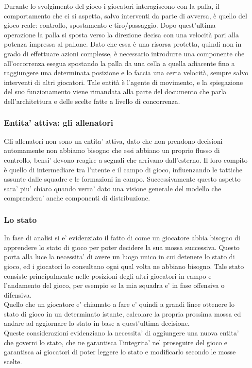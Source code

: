 Durante lo svolgimento del gioco i giocatori interagiscono con la palla, il comportamento che ci si aspetta, salvo interventi da parte di avversa, è quello del gioco reale: controllo, spostamento e tiro/passaggio. Dopo quest'ultima operazione la palla si sposta verso la direzione decisa con una velocità pari alla potenza impressa al pallone. Dato che essa è una risorsa protetta, quindi non in grado di effettuare azioni complesse, è necessario introdurre una componente che all'occorrenza esegua spostando la palla da una cella a quella adiacente fino a raggiungere una determinata posizione e lo faccia una certa velocità, sempre salvo interventi di altri giocatori. Tale entità è l'agente di movimento, e la spiegazione del suo funzionamento viene rimandata alla parte del documento che parla dell'architettura e delle scelte fatte a livello di concorrenza.

\subsubsection{Entita' attiva: gli allenatori}
\label{sec:entita_coinvolte_allenatori}

Gli allenatori non sono un entita' attiva, dato che non prendono decisioni automamente non abbiamo bisogno che essi abbiano un proprio flusso di controllo, bensi' devono reagire a segnali che arrivano dall'esterno. Il loro compito è quello di intermediare tra l'utente e il campo di gioco, influenzando le tattiche assunte dalle squadre e le formazioni in campo. Successivamente questo aspetto sara' piu' chiaro quando verra' dato una visione generale del modello che comprendera' anche componenti di distribuzione. 

\subsubsection{Lo stato}
\label{sec:entita_coinvolte_stato}

In fase di analisi si e' evidenziato il fatto di come un giocatore abbia bisogno di apprendere lo stato di gioco per poter decidere la sua mossa successiva. Questo porta alla luce la necessita' di avere un luogo unico in cui detenere lo stato di gioco, ed i giocatori lo consultano ogni qual volta ne abbiano bisogno. Tale stato consiste principalmente nelle posizioni degli altri giocatori in campo e l'andamento del gioco, per esempio se la mia squadra e' in fase offensiva o difensiva.\\

Quello che un giocatore e' chiamato a fare e' quindi a grandi linee ottenere lo stato di gioco in un determinato istante, calcolare la propria prossima mossa ed andare ad aggiornare lo stato in base a quest'ultima decisione.\\

Queste considerazioni evidenziano la necessita' di aggiungere una nuova entita' che governi lo stato, che ne garantisca l'integrita' nel proseguire del gioco e garantisca ai giocatori di poter leggere lo stato e modificarlo secondo le mosse scelte.
